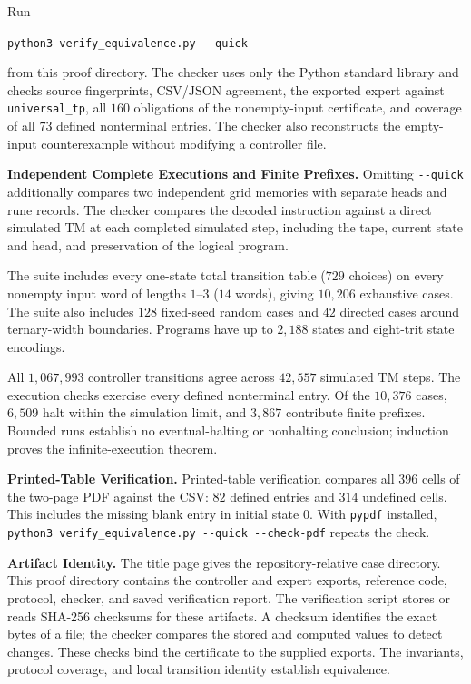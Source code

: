 \documentclass[11pt,a4paper]{article}
\newcommand{\code}[1]{\texttt{#1}}
\newcommand{\sectiontitle}[2]{\refstepcounter{section}\vspace*{2pt}{\LARGE\bfseries\color{Teal}\thesection\quad #2}\par\vspace{7pt}}
\begin{document}
\clearpage
\sectiontitle{6 \enspace VERIFICATION AND ARTIFACTS}{Verification and Artifacts}\label{sec:common6}
Run
\begin{center}\code{python3 verify\_equivalence.py {-}{-}quick}\end{center}
from this proof directory. The checker uses only the Python standard library and checks
source fingerprints, CSV/JSON agreement, the exported expert against
\code{universal\_tp}, all $160$ obligations of the nonempty-input certificate,
and coverage of all $73$ defined nonterminal entries. The checker also reconstructs
the empty-input counterexample without modifying a controller file.

\textbf{Independent Complete Executions and Finite Prefixes.}
Omitting \code{{-}{-}quick} additionally compares two independent grid memories
with separate heads and rune records. The checker compares the decoded instruction
against a direct simulated TM at each completed simulated step, including
the tape, current state and head, and preservation of the logical program.

The suite includes every one-state total transition table ($729$ choices)
on every nonempty input word of lengths $1$--$3$ ($14$ words), giving
$10{,}206$ exhaustive cases. The suite also includes $128$ fixed-seed random cases
and $42$ directed cases around ternary-width boundaries. Programs have up
to $2{,}188$ states and eight-trit state encodings.

All $1{,}067{,}993$ controller transitions agree across
$42{,}557$ simulated TM steps. The execution checks exercise every defined nonterminal entry. Of the $10{,}376$ cases, $6{,}509$ halt within the
simulation limit, and $3{,}867$ contribute finite prefixes. Bounded runs
establish no eventual-halting or nonhalting conclusion; induction proves
the infinite-execution theorem.

\textbf{Printed-Table Verification.}
Printed-table verification compares all $396$ cells of the two-page PDF
against the CSV: $82$ defined entries and $314$ undefined cells. This includes the
missing blank entry in initial state $0$. With \code{pypdf} installed,
\code{python3 verify\_equivalence.py {-}{-}quick {-}{-}check-pdf} repeats the check.

\textbf{Artifact Identity.}
The title page gives the repository-relative case directory. This proof directory
contains the controller and expert exports, reference code, protocol, checker,
and saved verification report. The verification script stores or reads SHA-256 checksums for these artifacts. A checksum identifies the exact bytes
of a file; the checker compares the stored and computed values to detect changes.
These checks bind the certificate to the supplied exports. The invariants,
protocol coverage, and local transition identity establish equivalence.
\end{document}
